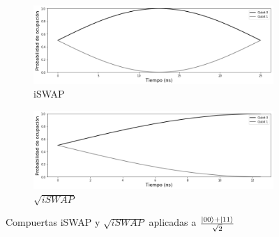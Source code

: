 \begin{figure}[H]
    \centering
    \begin{subfigure}[m]{0.49\textwidth}
        \centering \includegraphics[width=1\linewidth]{img/iswap0011.png}
        \caption{iSWAP}
    \end{subfigure}
    \begin{subfigure}[m]{0.49\textwidth}
        \centering \includegraphics[width=1\linewidth]{img/sqrtiswap0011.png}
        \caption{$\sqrt{iSWAP}$}
    \end{subfigure}
    \caption[Compuertas iSWAP y $\sqrt{iSWAP}$ aplicadas a $\frac{\ket{00} + \ket{11}}{\sqrt{2}}$]{Compuertas iSWAP y $\sqrt{iSWAP}$ aplicadas a $\frac{\ket{00} + \ket{11}}{\sqrt{2}}$}
\label{fig:iswapsqrtiswap0011}
\end{figure}

